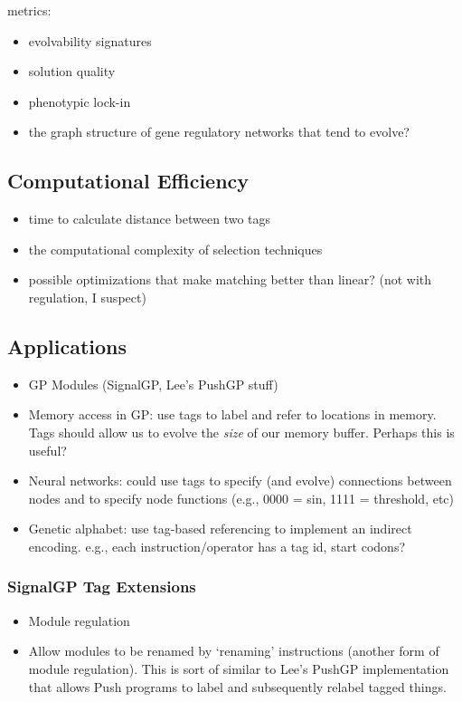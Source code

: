 metrics:
\begin{itemize}
\item evolvability signatures \citep{tarapore2015evolvability}
\item solution quality
\item phenotypic lock-in
\item the graph structure of gene regulatory networks that tend to evolve?
\end{itemize}

\subsection{Computational Efficiency}

\begin{itemize}
\item time to calculate distance between two tags
\item the computational complexity of selection techniques
\item possible optimizations that make matching better than linear?
(not with regulation, I suspect)
\end{itemize}

\subsection{Applications}

\begin{itemize}
  \item GP Modules (SignalGP, Lee's PushGP stuff)
  \item Memory access in GP: use tags to label and refer to locations in memory.
        Tags should allow us to evolve the \textit{size} of our memory buffer. Perhaps
        this is useful?
  \item Neural networks: could use tags to specify (and evolve) connections between
        nodes and to specify node functions (e.g., 0000 = sin, 1111 = threshold, etc)
  \item Genetic alphabet: use tag-based referencing to implement an indirect encoding.
        e.g., each instruction/operator has a tag id, start codons?
\end{itemize}

\subsubsection{SignalGP Tag Extensions}

\begin{itemize}
  \item Module regulation
  \item Allow modules to be renamed by `renaming' instructions (another form of
        module regulation). This is sort of similar to Lee's PushGP implementation
        that allows Push programs to label and subsequently relabel tagged things.
\end{itemize}

